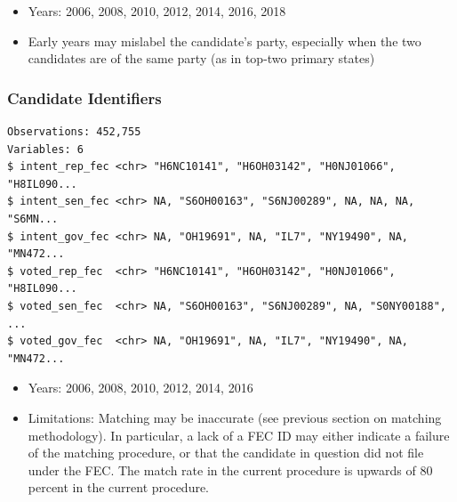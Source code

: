 \documentclass[10pt,article,oneside]{memoir}
\theoremstyle{definition}
\begin{document}
\begin{itemize}
\tightlist
\item
  Years: 2006, 2008, 2010, 2012, 2014, 2016, 2018
\item
  Early years may mislabel the candidate's party, especially when the
  two candidates are of the same party (as in top-two primary states)
\end{itemize}

\subsubsection{Candidate Identifiers}\label{candidate-identifiers}

\begin{verbatim}
Observations: 452,755
Variables: 6
$ intent_rep_fec <chr> "H6NC10141", "H6OH03142", "H0NJ01066", "H8IL090...
$ intent_sen_fec <chr> NA, "S6OH00163", "S6NJ00289", NA, NA, NA, "S6MN...
$ intent_gov_fec <chr> NA, "OH19691", NA, "IL7", "NY19490", NA, "MN472...
$ voted_rep_fec  <chr> "H6NC10141", "H6OH03142", "H0NJ01066", "H8IL090...
$ voted_sen_fec  <chr> NA, "S6OH00163", "S6NJ00289", NA, "S0NY00188", ...
$ voted_gov_fec  <chr> NA, "OH19691", NA, "IL7", "NY19490", NA, "MN472...
\end{verbatim}

\begin{itemize}
\tightlist
\item
  Years: 2006, 2008, 2010, 2012, 2014, 2016
\item
  Limitations: Matching may be inaccurate (see previous section on
  matching methodology). In particular, a lack of a FEC ID may either
  indicate a failure of the matching procedure, or that the candidate in
  question did not file under the FEC. The match rate in the current
  procedure is upwards of 80 percent in the current procedure.
\end{itemize}
\end{document}
